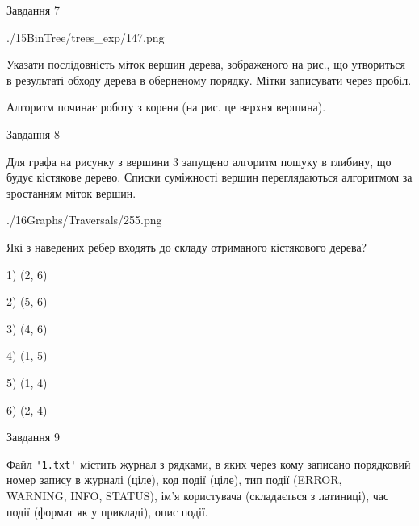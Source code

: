 \documentclass[12pt, ukrainian]{article}
\def\code#1{\Verb!#1!}
\begin{document}
{\newpage
\begin{minipage}[t]{9.7cm}
               
{\begin{center}Завдання {7}\end{center}}
\vspace{-6mm}

\begin{center}
	{./15BinTree/trees_exp/147.png}
\end{center}
Указати послідовність міток вершин дерева, зображеного на рис., що утвориться в результаті обходу дерева в оберненому порядку. Мітки записувати через пробіл.\par Алгоритм починає роботу з кореня (на рис. це верхня вершина).\par

\end{minipage}
\vline \hspace{8mm}
\begin{minipage}[t]{8.0cm}
               
{\begin{center}Завдання {8}\end{center}}
\vspace{-6mm}
Для графа на рисунку з вершини 3 запущено алгоритм пошуку в глибину, що будує кістякове дерево. Списки суміжності вершин переглядаються алгоритмом за зростанням міток вершин.\par
\begin{center}
	{./16Graphs/Traversals/255.png}
\end{center}
\par Які з наведених ребер входять до складу отриманого кістякового дерева?\par
1) (2, 6)\par
2) (5, 6)\par
3) (4, 6)\par
4) (1, 5)\par
5) (1, 4)\par
6) (2, 4)\par
{\vskip 15pt} \par

\end{minipage}

               
{\begin{center}Завдання {9}\end{center}}
\vspace{-6mm}
Файл \code{'1.txt'} містить журнал з рядками, в яких через кому записано поряд\-ко\-вий номер запису в журналі (ціле), код події (ціле), тип події (ERROR,\\ WARNING, INFO, STATUS), ім'я користувача (складається з латиниці), час події (фор\-мат як у прикладі), опис події.

}
\end{document}

